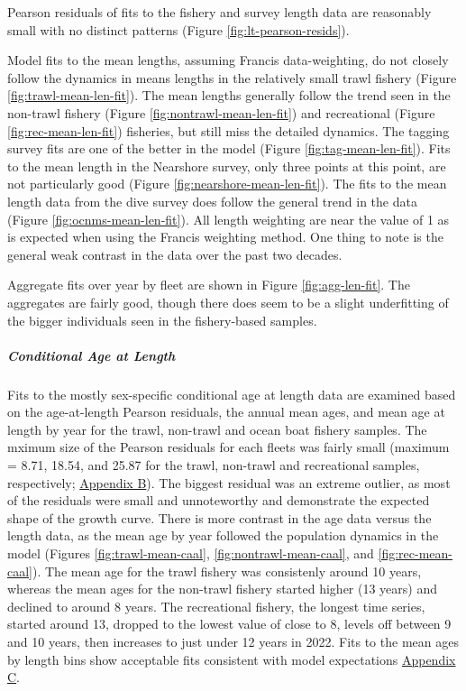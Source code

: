 \documentclass[11pt,
  english,
  letterpaper,
]{article}
\begin{document}
Pearson residuals of fits to the fishery and survey length data are reasonably small with no distinct patterns (Figure \ref{fig:lt-pearson-resids}).

Model fits to the mean lengths, assuming Francis data-weighting, do not closely follow the dynamics in means lengths in the relatively small trawl fishery (Figure \ref{fig:trawl-mean-len-fit}). The mean lengths generally follow the trend seen in the non-trawl fishery (Figure \ref{fig:nontrawl-mean-len-fit}) and recreational (Figure \ref{fig:rec-mean-len-fit}) fisheries, but still miss the detailed dynamics. The tagging survey fits are one of the better in the model (Figure \ref{fig:tag-mean-len-fit}). Fits to the mean length in the Nearshore survey, only three points at this point, are not particularly good (Figure \ref{fig:nearshore-mean-len-fit}). The fits to the mean length data from the dive survey does follow the general trend in the data (Figure \ref{fig:ocnms-mean-len-fit}). All length weighting are near the value of 1 as is expected when using the Francis weighting method. One thing to note is the general weak contrast in the data over the past two decades.

Aggregate fits over year by fleet are shown in Figure \ref{fig:agg-len-fit}. The aggregates are fairly good, though there does seem to be a slight underfitting of the bigger individuals seen in the fishery-based samples.

\hypertarget{conditional-age-at-length}{%
\subparagraph{Conditional Age at Length}\label{conditional-age-at-length}}

Fits to the mostly sex-specific conditional age at length data are examined based on the age-at-length Pearson residuals, the annual mean ages, and mean age at length by year for the trawl, non-trawl and ocean boat fishery samples. The mximum size of the Pearson residuals for each fleets was fairly small (maximum = 8.71, 18.54, and 25.87 for the trawl, non-trawl and recreational samples, respectively; \protect\hyperlink{app_b}{Appendix B}). The biggest residual was an extreme outlier, as most of the residuals were small and unnoteworthy and demonstrate the expected shape of the growth curve. There is more contrast in the age data versus the length data, as the mean age by year followed the population dynamics in the model (Figures \ref{fig:trawl-mean-caal}, \ref{fig:nontrawl-mean-caal}, and \ref{fig:rec-mean-caal}). The mean age for the trawl fishery was consistenly around 10 years, whereas the mean ages for the non-trawl fishery started higher (13 years) and declined to around 8 years. The recreational fishery, the longest time series, started around 13, dropped to the lowest value of close to 8, levels off between 9 and 10 years, then increases to just under 12 years in 2022. Fits to the mean ages by length bins show acceptable fits consistent with model expectations \protect\hyperlink{app_c}{Appendix C}.
\end{document}
